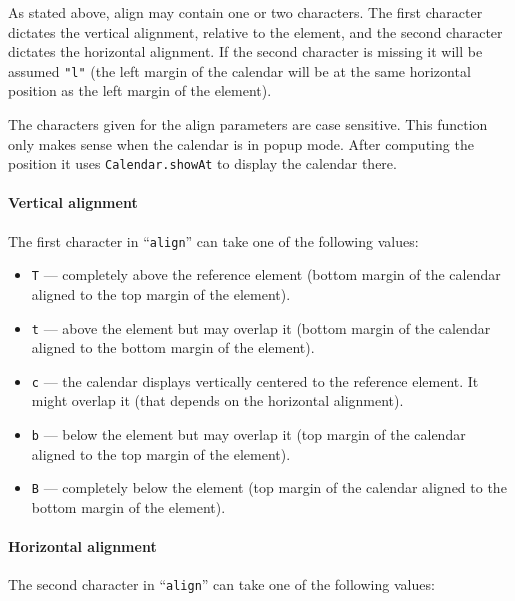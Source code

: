 \documentclass[a4paper,10pt]{article}
\begin{document}
As stated above, align may contain one or two characters.  The first character
dictates the vertical alignment, relative to the element, and the second
character dictates the horizontal alignment.  If the second character is
missing it will be assumed \texttt{"l"} (the left margin of the calendar will
be at the same horizontal position as the left margin of the element).

The characters given for the align parameters are case sensitive.  This
function only makes sense when the calendar is in popup mode.  After computing
the position it uses \texttt{Calendar.showAt} to display the calendar there.

\paragraph{Vertical alignment}
The first character in ``\texttt{align}'' can take one of the following values:

\begin{itemize}

\item \texttt{T} --- completely above the reference element (bottom margin of
the calendar aligned to the top margin of the element).

\item \texttt{t} --- above the element but may overlap it (bottom margin of the calendar aligned to
the bottom margin of the element).

\item \texttt{c} --- the calendar displays vertically centered to the reference
element.  It might overlap it (that depends on the horizontal alignment).

\item \texttt{b} --- below the element but may overlap it (top margin of the calendar aligned to
the top margin of the element).

\item \texttt{B} --- completely below the element (top margin of the calendar
aligned to the bottom margin of the element).

\end{itemize}

\paragraph{Horizontal alignment}
The second character in ``\texttt{align}'' can take one of the following values:
\end{document}
